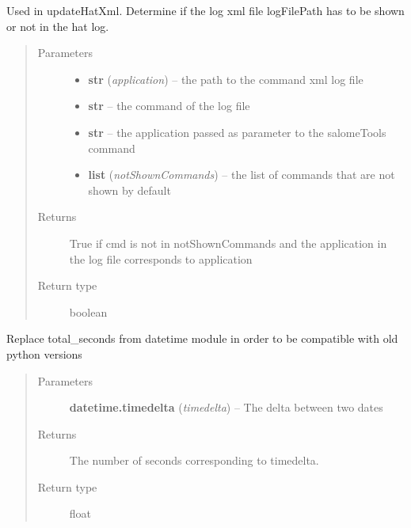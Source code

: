 \documentclass[a4paper,10pt,english]{sphinxmanual}
\begin{document}
\begin{fulllineitems}
\label{commands/apidoc/src:src.logger.show_command_log}
Used in updateHatXml. 
Determine if the log xml file logFilePath 
has to be shown or not in the hat log.
\begin{quote}\begin{description}
\item[{Parameters}] \leavevmode\begin{itemize}
\item {} 
\textbf{str} (\emph{application}) -- the path to the command xml log file

\item {} 
\textbf{str} -- the command of the log file

\item {} 
\textbf{str} -- the application passed as parameter 
to the salomeTools command

\item {} 
\textbf{list} (\emph{notShownCommands}) -- the list of commands 
that are not shown by default

\end{itemize}

\item[{Returns}] \leavevmode
True if cmd is not in notShownCommands and the application 
in the log file corresponds to application

\item[{Return type}] \leavevmode
boolean

\end{description}\end{quote}

\end{fulllineitems}


\begin{fulllineitems}
\label{commands/apidoc/src:src.logger.timedelta_total_seconds}
Replace total\_seconds from datetime module 
in order to be compatible with old python versions
\begin{quote}\begin{description}
\item[{Parameters}] \leavevmode
\textbf{datetime.timedelta} (\emph{timedelta}) -- The delta between two dates

\item[{Returns}] \leavevmode
The number of seconds corresponding to timedelta.

\item[{Return type}] \leavevmode
float

\end{description}\end{quote}

\end{fulllineitems}
\end{document}
